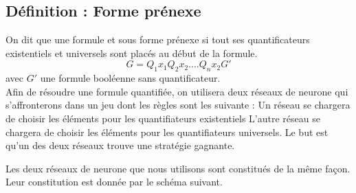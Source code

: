 \documentclass{article}
\begin{document}
\subsection{Définition : Forme prénexe}
	On dit que une formule et sous forme prénexe si tout ses quantificateurs existentiels et universels sont placés au début de la formule. 
	\[ G= Q_{1}x_{1}Q_{2}x_{2}....Q_{n}x_{2}G' \] avec $G'$ une formule booléenne sans quantificateur.
\newline \\
Afin de résoudre une formule quantifiée, on utilisera deux réseaux de neurone qui s'affronterons dans un jeu dont les règles sont les suivante : 
	Un réseau se chargera de choisir les éléments pour les quantifiateurs existentiels  
	L'autre réseau se chargera de choisir les éléments pour les quantifiateurs universels. Le but est qu'un des deux réseaux trouve une stratégie gagnante.

Les deux réseaux de neurone que nous utilisons sont constitués de la même façon. Leur constitution est donnée par le schéma suivant.

\begin{center}
\end{center}
\end{document}
